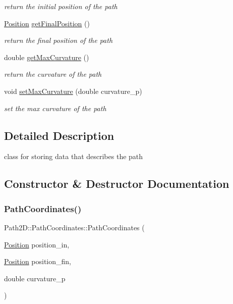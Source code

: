 \begin{DoxyCompactItemize}
\begin{DoxyCompactList}\small\item\em return the initial position of the path \end{DoxyCompactList}\item 
\mbox{\hyperlink{class_path2_d_1_1_element_1_1_position}{Position}} \mbox{\hyperlink{class_path2_d_1_1_path_coordinates_a9b1fb5c8b4f8c6dc9e40be6d4c884e3c}{get\+Final\+Position}} ()
\begin{DoxyCompactList}\small\item\em return the final position of the path \end{DoxyCompactList}\item 
double \mbox{\hyperlink{class_path2_d_1_1_path_coordinates_ada194582d1892714ed91e12824dc3a8b}{get\+Max\+Curvature}} ()
\begin{DoxyCompactList}\small\item\em return the curvature of the path \end{DoxyCompactList}\item 
void \mbox{\hyperlink{class_path2_d_1_1_path_coordinates_adccb86c0322e9f2dcf7845b3af42cc84}{set\+Max\+Curvature}} (double curvature\+\_\+p)
\begin{DoxyCompactList}\small\item\em set the max curvature of the path \end{DoxyCompactList}\end{DoxyCompactItemize}


\subsection{Detailed Description}
class for storing data that describes the path 

\subsection{Constructor \& Destructor Documentation}
\mbox{\label{class_path2_d_1_1_path_coordinates_af7be6e64bbe0e3d555a05fb03fc674ef}} 
\subsubsection{\texorpdfstring{Path\+Coordinates()}{PathCoordinates()}}
{\footnotesize\ttfamily Path2\+D\+::\+Path\+Coordinates\+::\+Path\+Coordinates (\begin{DoxyParamCaption}\item[{\mbox{\hyperlink{class_path2_d_1_1_element_1_1_position}{Position}}}]{position\+\_\+in,  }\item[{\mbox{\hyperlink{class_path2_d_1_1_element_1_1_position}{Position}}}]{position\+\_\+fin,  }\item[{double}]{curvature\+\_\+p }\end{DoxyParamCaption})}



